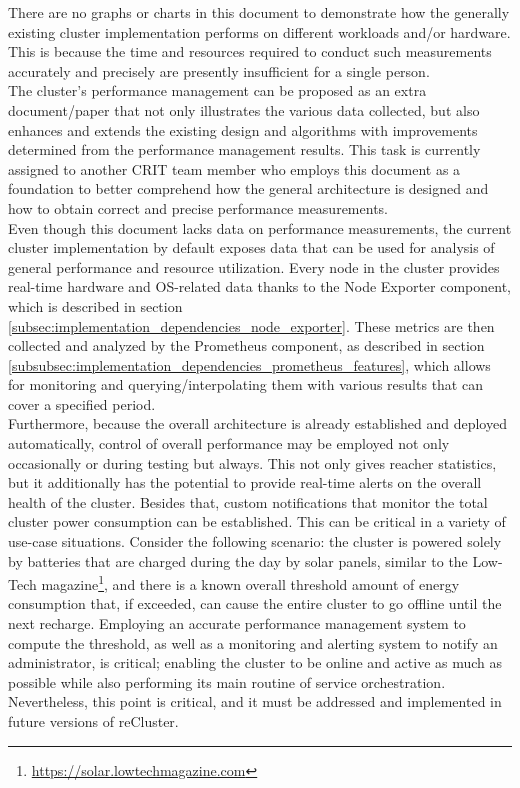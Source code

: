 There are no graphs or charts in this document to demonstrate how the generally existing
cluster implementation performs on different workloads and/or hardware. This is
because the time and resources required to conduct such measurements accurately
and precisely are presently insufficient for a single person. \\ %
The cluster's performance management can be proposed as an extra document/paper
that not only illustrates the various data collected, but also enhances and extends
the existing design and algorithms with improvements determined from the performance
management results. This task is currently assigned to another CRIT team member
who employs this document as a foundation to better comprehend how the general
architecture is designed and how to obtain correct and precise performance
measurements. \\ %
Even though this document lacks data on performance measurements, the current cluster
implementation by default exposes data that can be used for analysis of general performance
and resource utilization. Every node in the cluster provides real-time hardware
and OS-related data thanks to the Node Exporter component, which is described in
section \ref{subsec:implementation_dependencies_node_exporter}. These metrics
are then collected and analyzed by the Prometheus component, as described in section
\ref{subsubsec:implementation_dependencies_prometheus_features}, which allows
for monitoring and querying/interpolating them with various results that can
cover a specified period. \\ %
Furthermore, because the overall architecture is already established and deployed
automatically, control of overall performance may be employed not only
occasionally or during testing but always. This not only gives reacher statistics,
but it additionally has the potential to provide real-time alerts on the overall
health of the cluster. Besides that, custom notifications that monitor the total
cluster power consumption can be established. This can be critical in a variety of
use-case situations. Consider the following scenario: the cluster is powered solely
by batteries that are charged during the day by solar panels, similar to the Low-Tech
magazine\footnote{\url{https://solar.lowtechmagazine.com}}, and there is a known
overall threshold amount of energy consumption that, if exceeded, can cause the entire
cluster to go offline until the next recharge. Employing an accurate performance
management system to compute the threshold, as well as a monitoring and alerting
system to notify an administrator, is critical; enabling the cluster to be online
and active as much as possible while also performing its main routine of service
orchestration. \\ %
Nevertheless, this point is critical, and it must be addressed and implemented in
future versions of reCluster. \\ %

